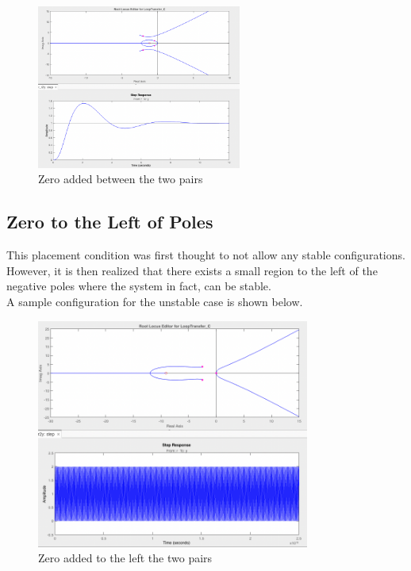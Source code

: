\begin{figure}[H]
    \centering
    \includegraphics[width=0.6\textwidth]{images/zero_between.png}
    \caption{Zero added between the two pairs}
    \label{fig:zerobetween}
\end{figure}


\subsection{Zero to the Left of Poles}

This placement condition was first thought to not allow any stable configurations. However, it is then realized that there exists a small region to the left of the negative poles where the system in fact, can be stable. \\

A sample configuration for the unstable case is shown below.

\begin{figure}[H]
    \centering
    \includegraphics[width=0.8\textwidth]{images/zero_right.png}
    \caption{Zero added to the left the two pairs}
    \label{fig:zerobetween}
\end{figure}

